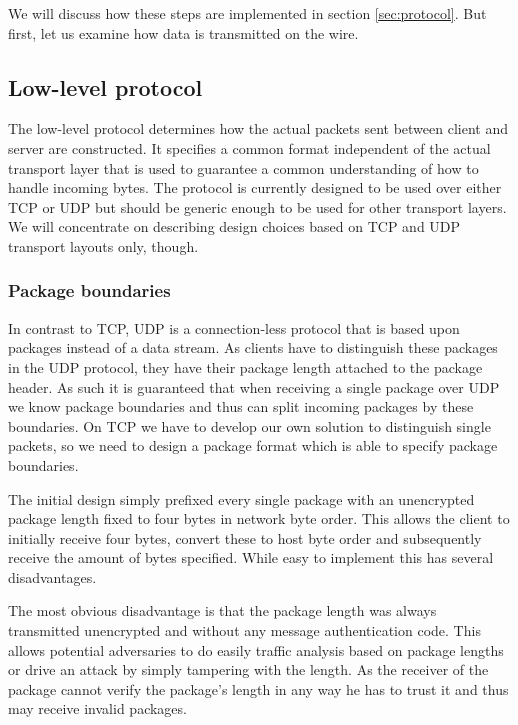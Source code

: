 We will discuss how these steps are implemented in section \ref{sec:protocol}.
But first, let us examine how data is transmitted on the wire.

\subsection{Low-level protocol}
\label{sec:low-level-protocol}

The low-level protocol determines how the actual packets sent between client and server are constructed.
It specifies a common format independent of the actual transport layer that is used to guarantee a common understanding of how to handle incoming bytes.
The protocol is currently designed to be used over either TCP or UDP but should be generic enough to be used for other transport layers.
We will concentrate on describing design choices based on TCP and UDP transport layouts only, though.

\subsubsection{Package boundaries}

In contrast to TCP, UDP is a connection-less protocol that is based upon packages instead of a data stream.
As clients have to distinguish these packages in the UDP protocol, they have their package length attached to the package header.
As such it is guaranteed that when receiving a single package over UDP we know package boundaries and thus can split incoming packages by these boundaries.
On TCP we have to develop our own solution to distinguish single packets, so we need to design a package format which is able to specify package boundaries.

The initial design simply prefixed every single package with an unencrypted package length fixed to four bytes in network byte order.
This allows the client to initially receive four bytes, convert these to host byte order and subsequently receive the amount of bytes specified.
While easy to implement this has several disadvantages.

The most obvious disadvantage is that the package length was always transmitted unencrypted and without any message authentication code.
This allows potential adversaries to do easily traffic analysis based on package lengths or drive an attack by simply tampering with the length.
As the receiver of the package cannot verify the package's length in any way he has to trust it and thus may receive invalid packages.

